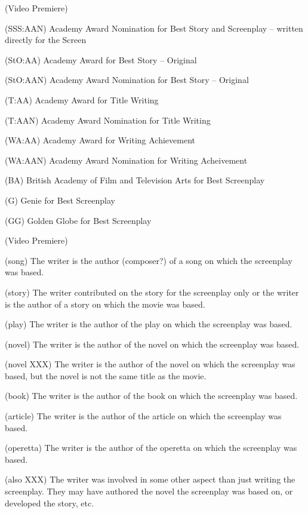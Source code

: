 \begin{Ventry}{(Video Premiere)}
\item[(SSS:AAN)]   Academy Award Nomination for Best Story and Screenplay 
-- written directly for the Screen
\item[(StO:AA)]    Academy Award for Best Story -- Original
\item[(StO:AAN)]   Academy Award Nomination for Best Story -- Original
\item[(T:AA)]      Academy Award for Title Writing
\item[(T:AAN)]     Academy Award Nomination for Title Writing
\item[(WA:AA)]     Academy Award for Writing Achievement
\item[(WA:AAN)]    Academy Award Nomination for Writing Acheivement
\item[(BA)]        British Academy of Film and Television Arts for 
Best Screenplay
\item[(G)]         Genie for Best Screenplay
\item[(GG)]        Golden Globe for Best Screenplay
\end{Ventry}

\begin{Ventry}{(Video Premiere)}
\item[(song)]   The writer is the author (composer?) of a song on
 which the screenplay was based.
\item[(story)]         The writer contributed on the story for the
 screenplay only or the writer is the author of a
 story on which the movie was based.
\item[(play)]          The writer is the author of the play on which the
 screenplay was based.
\item[(novel)]         The writer is the author of the novel on which the
 screenplay was based.
\item[(novel XXX)]     The writer is the author of the novel on which the
 screenplay was based, but the novel is not the same
 title as the movie.
\item[(book)]          The writer is the author of the book on which the
 screenplay was based.
\item[(article)]       The writer is the author of the article on which the
 screenplay was based.
\item[(operetta)]      The writer is the author of the operetta on which the
 screenplay was based.
\item[(also XXX)]      The writer was involved in some other aspect than
 just writing the screenplay.  They may have authored the novel
 the screenplay was based on, or developed the story, etc.
\end{Ventry}
